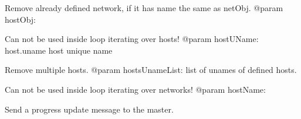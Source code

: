 \documentclass[letterpaper,10pt,english]{sphinxmanual}
\begin{document}
\begin{fulllineitems}
\begin{fulllineitems}
\end{fulllineitems}


\begin{fulllineitems}
\label{ref-manual/XrdTest:XrdTest.ClusterManager.ClusterManager.removeDanglingNetwork}
Remove already defined network, if it has name the same as netObj.
@param hostObj:

\end{fulllineitems}


\begin{fulllineitems}
\label{ref-manual/XrdTest:XrdTest.ClusterManager.ClusterManager.removeHost}
Can not be used inside loop iterating over hosts!
@param hostUName: host.uname host unique name

\end{fulllineitems}


\begin{fulllineitems}
\label{ref-manual/XrdTest:XrdTest.ClusterManager.ClusterManager.removeHosts}
Remove multiple hosts.
@param hostsUnameList: list of unames of defined hosts.

\end{fulllineitems}


\begin{fulllineitems}
\label{ref-manual/XrdTest:XrdTest.ClusterManager.ClusterManager.removeNetwork}
Can not be used inside loop iterating over networks!
@param hostName:

\end{fulllineitems}


\begin{fulllineitems}
\label{ref-manual/XrdTest:XrdTest.ClusterManager.ClusterManager.updateState}
Send a progress update message to the master.


\end{fulllineitems}
\end{fulllineitems}
\end{document}
